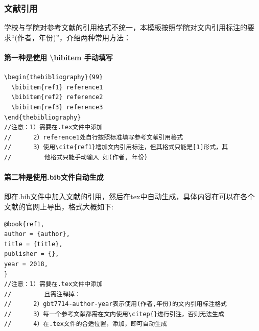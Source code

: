 \documentclass[AutoFakeBold]{ZafuThesis}
\begin{document}
\subsubsection{文献引用}
学校与学院对参考文献的引用格式不统一，本模板按照学院对文内引用标注的要求“(作者，年份)”，介绍两种常用方法：
\paragraph{第一种是使用 \textbackslash bibitem 手动填写}
\begin{lstlisting} 
\begin{thebibliography}{99}
  \bibitem{ref1} reference1 
  \bibitem{ref2} reference2
  \bibitem{ref3} reference3
\end{thebibliography}
//注意：1）需要在.tex文件中添加
//      2）reference1处自行按照标准填写参考文献引用格式
//      3）使用\cite{ref1}增加文内引用标注，但其格式只能是[1]形式，其
//         他格式只能手动输入 如(作者, 年份)
\end{lstlisting}

\paragraph{第二种是使用.bib文件自动生成}即在.bib文件中加入文献的引用，然后在tex中自动生成，具体内容在可以在各个文献的官网上导出，格式大概如下:
\begin{lstlisting} 
@book{ref1,
author = {author}, 
title = {title},
publisher = {},
year = 2018,
}
//注意：1）需要在.tex文件中添加
//         且需注释掉：
//      2）gbt7714-author-year表示使用(作者,年份)的文内引用标注格式
//      3）每一个参考文献都需在文内使用\citep{}进行引注，否则无法生成
//      4）在.tex文件的合适位置，添加，即可自动生成
\end{lstlisting}
\end{document}
